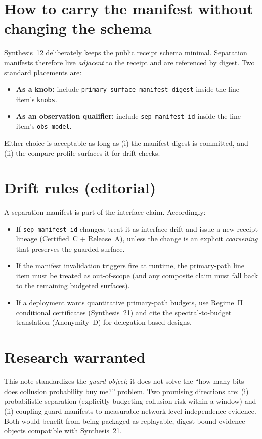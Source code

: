\documentclass[11pt]{article}
\begin{document}
\section{How to carry the manifest without changing the schema}
Synthesis~12 deliberately keeps the public receipt schema minimal.
Separation manifests therefore live \emph{adjacent} to the receipt and are referenced by digest.
Two standard placements are:
\begin{itemize}[leftmargin=*]
\item \textbf{As a knob:} include \texttt{primary\_surface\_manifest\_digest} inside the line item's \texttt{knobs}.
\item \textbf{As an observation qualifier:} include \texttt{sep\_manifest\_id} inside the line item's \texttt{obs\_model}.
\end{itemize}
Either choice is acceptable as long as (i) the manifest digest is committed, and (ii) the compare profile surfaces it for drift checks.\cite{series:receiptitems,series:workedexample}

\section{Drift rules (editorial)}
A separation manifest is part of the interface claim.
Accordingly:
\begin{itemize}[leftmargin=*]
\item If \texttt{sep\_manifest\_id} changes, treat it as interface drift and issue a new receipt lineage (Certified~C + Release~A), unless the change is an explicit \emph{coarsening} that preserves the guarded surface.\cite{series:planstateequiv}
\item If the manifest invalidation triggers fire at runtime, the primary-path line item must be treated as out-of-scope (and any composite claim must fall back to the remaining budgeted surfaces).
\item If a deployment wants quantitative primary-path budgets, use Regime~II conditional certificates (Synthesis~21) and cite the spectral-to-budget translation (Anonymity~D) for delegation-based designs.\cite{series:condcert,series:spectral2budget}
\end{itemize}

\section{Research warranted}
This note standardizes the \emph{guard object}; it does not solve the ``how many bits does collusion probability buy me?'' problem.
Two promising directions are:
(i) probabilistic separation (explicitly budgeting collusion risk within a window) and
(ii) coupling guard manifests to measurable network-level independence evidence.
Both would benefit from being packaged as replayable, digest-bound evidence objects compatible with Synthesis~21.
\end{document}

